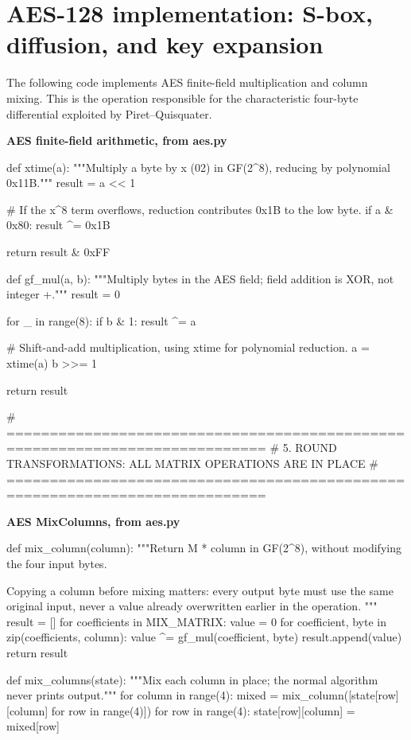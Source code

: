 \section{AES-128 implementation: S-box, diffusion, and key expansion}
The following code implements AES finite-field multiplication and column mixing. This is the operation responsible for the characteristic four-byte differential exploited by Piret--Quisquater.
\par\smallskip\noindent\textbf{AES finite-field arithmetic, from aes.py}\par
\begin{lightcode}
def xtime(a):
    """Multiply a byte by x (02) in GF(2^8), reducing by polynomial 0x11B."""
    result = a << 1

    # If the x^8 term overflows, reduction contributes 0x1B to the low byte.
    if a & 0x80:
        result ^= 0x1B

    return result & 0xFF


def gf_mul(a, b):
    """Multiply bytes in the AES field; field addition is XOR, not integer +."""
    result = 0

    for _ in range(8):
        if b & 1:
            result ^= a

        # Shift-and-add multiplication, using xtime for polynomial reduction.
        a = xtime(a)
        b >>= 1

    return result


# ============================================================================
# 5. ROUND TRANSFORMATIONS: ALL MATRIX OPERATIONS ARE IN PLACE
# ============================================================================
\end{lightcode}
\par\smallskip\noindent\textbf{AES MixColumns, from aes.py}\par
\begin{lightcode}
def mix_column(column):
    """Return M * column in GF(2^8), without modifying the four input bytes.

    Copying a column before mixing matters: every output byte must use the same
    original input, never a value already overwritten earlier in the operation.
    """
    result = []
    for coefficients in MIX_MATRIX:
        value = 0
        for coefficient, byte in zip(coefficients, column):
            value ^= gf_mul(coefficient, byte)
        result.append(value)
    return result


def mix_columns(state):
    """Mix each column in place; the normal algorithm never prints output."""
    for column in range(4):
        mixed = mix_column([state[row][column] for row in range(4)])
        for row in range(4):
            state[row][column] = mixed[row]
\end{lightcode}
